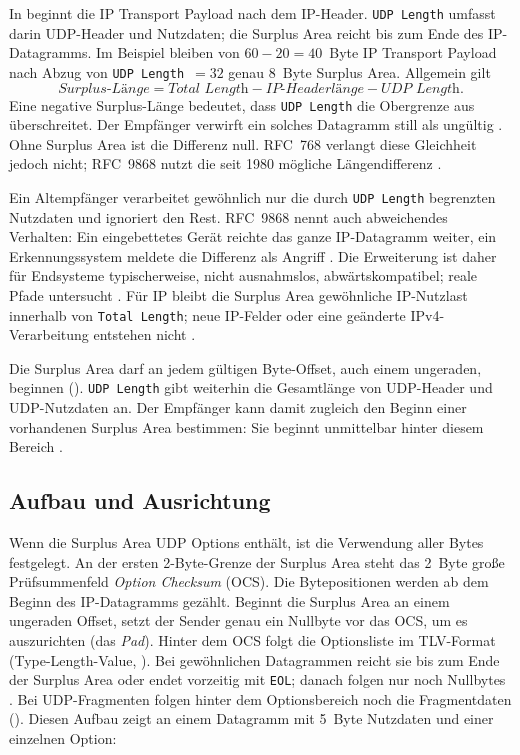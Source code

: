 In  beginnt die IP Transport Payload nach dem IP-Header. \texttt{UDP Length}
umfasst darin UDP-Header und Nutzdaten; die Surplus Area reicht bis zum Ende des IP-Datagramms. Im Beispiel
bleiben von $60-20=40$~Byte IP Transport Payload nach Abzug von \texttt{UDP Length}~$=32$ genau 8~Byte
Surplus Area. Allgemein gilt
\begin{equation}
  \textit{Surplus-Länge} = \textit{Total Length} - \textit{IP-Headerlänge} - \textit{UDP Length}.
  \label{eq:surplus-laenge}
\end{equation}
Eine negative Surplus-Länge bedeutet, dass \texttt{UDP Length} die Obergrenze aus
 überschreitet. Der Empfänger verwirft ein solches Datagramm still als
ungültig \cite[Sec.~10]{rfc9868}. Ohne Surplus Area ist die Differenz null. RFC~768 verlangt diese Gleichheit
jedoch nicht; RFC~9868 nutzt die seit 1980 mögliche Längendifferenz \cite[Sec.~7]{rfc9868}.

Ein Altempfänger verarbeitet gewöhnlich nur die durch \texttt{UDP Length} begrenzten Nutzdaten und
ignoriert den Rest. RFC~9868 nennt auch abweichendes Verhalten: Ein eingebettetes Gerät reichte das ganze
IP-Datagramm weiter, ein Erkennungssystem meldete die Differenz als Angriff \cite[Sec.~18]{rfc9868}. Die
Erweiterung ist daher für Endsysteme typischerweise, nicht ausnahmslos, abwärtskompatibel; reale Pfade
untersucht . Für IP bleibt die Surplus Area gewöhnliche IP-Nutzlast innerhalb von
\texttt{Total Length}; neue IP-Felder oder eine geänderte IPv4-Verarbeitung entstehen nicht
\cite[Sec.~16]{rfc9868}.

Die Surplus Area darf an jedem gültigen Byte-Offset, auch einem ungeraden, beginnen
(). \texttt{UDP Length} gibt weiterhin die Gesamtlänge von UDP-Header und
UDP-Nutzdaten an. Der Empfänger kann damit zugleich den Beginn einer vorhandenen Surplus Area bestimmen:
Sie beginnt unmittelbar hinter diesem Bereich \cite[Sec.~7 und 21]{rfc9868}.

\newpage

\subsection{Aufbau und Ausrichtung}
\label{subsec:surplus-aufbau}

Wenn die Surplus Area UDP Options enthält, ist die Verwendung aller Bytes festgelegt. An der ersten
2-Byte-Grenze der Surplus Area steht das 2~Byte große Prüfsummenfeld \textit{Option Checksum} (OCS). Die
Bytepositionen werden ab dem Beginn des IP-Datagramms gezählt. Beginnt die Surplus Area an einem ungeraden
Offset, setzt der Sender genau ein Nullbyte vor das OCS, um es auszurichten (das \textit{Pad}). Hinter dem
OCS folgt die Optionsliste im TLV-Format (Type-Length-Value, ). Bei gewöhnlichen
Datagrammen reicht sie bis zum Ende der Surplus Area oder endet vorzeitig mit \texttt{EOL}; danach folgen
nur noch Nullbytes \cite[Sec.~8]{rfc9868}. Bei UDP-Fragmenten folgen hinter dem Optionsbereich noch die
Fragmentdaten (). Diesen Aufbau zeigt  an einem
Datagramm mit 5~Byte Nutzdaten und einer einzelnen Option:

